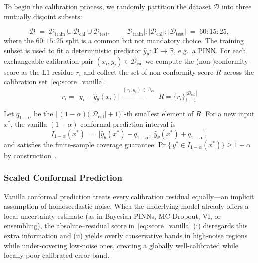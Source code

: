 \documentclass[preprint,12pt]{elsarticle}
\begin{document}
To begin the calibration process, we randomly partition the dataset $\mathcal{D}$ into three mutually disjoint subsets:

\begin{equation}
  \mathcal D \;=\;
  \mathcal D_{\mathrm{train}} \cup
  \mathcal D_{\mathrm{cal}} \cup
  \mathcal D_{\mathrm{test}},
  \qquad
  |\mathcal D_{\mathrm{train}}|:|\mathcal D_{\mathrm{cal}}|:|\mathcal D_{\mathrm{test}}|
  \;=\; 60:15:25 ,
  \label{eq:data_split_vanilla}
\end{equation}
%
where the $60 : 15 : 25$ split is a common but not mandatory choice. The training subset is used to fit a deterministic predictor $\hat y_{\theta}\!:\mathcal X\!\to\!\mathbb R$, e.g.\ a PINN. For each exchangeable calibration pair $(x_i,y_i)\in\mathcal D_{\mathrm{cal}}$ we compute the (non-)conformity score as the $\mathrm{L}1$ residue $r_i$ and collect the set of non-conformity score $R$ across the calibration set~\eqref{eq:score_vanilla}.
%
\begin{equation}
  r_i = \bigl|\,y_i - \hat y_{\theta}(x_i)\bigr|
  \xrightarrow{\,(x_i,y_i)\in\mathcal D_{\mathrm{cal}}\,}
  R = \{r_i\}_{i=1}^{|\mathcal D_{\mathrm{cal}}|}
  \label{eq:score_vanilla}
\end{equation}
%

Let $q_{1-\alpha}$ be the
$\lceil (1-\alpha)\bigl(|\mathcal D_{\mathrm{cal}}|+1\bigr)\rceil$-th smallest element of $R$.  
For a new input $x^\ast$, the vanilla $(1-\alpha)$ conformal
prediction interval is
%
\begin{equation}
  I_{1-\alpha}(x^\ast)
  \;=\;
  \bigl[
      \hat y_{\theta}(x^\ast) - q_{1-\alpha},\;
      \hat y_{\theta}(x^\ast) + q_{1-\alpha}
  \bigr],
  \label{eq:vanilla_cp_interval}
\end{equation}
%
and satisfies the finite-sample coverage guarantee
$\Pr\!\bigl\{\,y^\ast\in I_{1-\alpha}(x^\ast)\bigr\}\ge 1-\alpha$ by construction~\cite{angelopoulos_gentle_2022}.

\bigskip
\subsubsection{Scaled Conformal Prediction}
\label{sec:sub:scaled_cp}

Vanilla conformal prediction treats every calibration residual equally—an implicit assumption of homoscedastic noise.
When the underlying model already offers a local uncertainty estimate (as in Bayesian PINNs, MC‐Dropout, VI, or ensembling), the absolute–residual score in~\eqref{eq:score_vanilla} (i) disregards this extra information and (ii) yields overly conservative bands in high‐noise regions while under-covering low‐noise ones, creating a globally well-calibrated while locally poor-calibrated error band.
\end{document}
